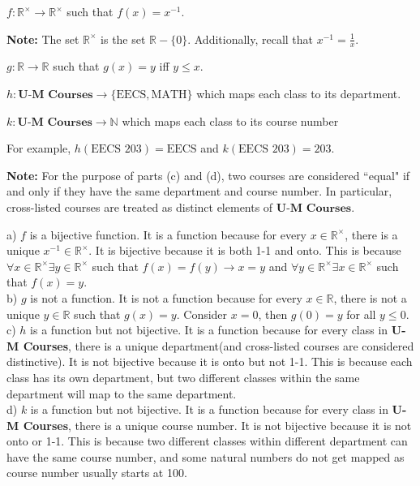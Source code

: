 \documentclass[12pt]{exam}
\begin{document}
\begin{qparts}
	\item $f \colon \mathbb{R}^{\times} \to \mathbb{R}^{\times}$ such that $f(x) = x^{-1}.$

	\textbf{Note:} The set $\mathbb{R}^{\times}$ is the set $\mathbb{R}-\{0\}.$ Additionally, recall that $x^{-1}=\frac 1x.$

	\item $g \colon \mathbb{R} \to \mathbb{R}$ such that $g(x) = y$ iff $y \leq x.$
	\item $h \colon \textbf{U-M Courses} \to \{ \text{EECS}, \text{MATH} \}$ which maps each class to its department.
	\item $k \colon \textbf{U-M Courses} \to \mathbb{N}$ which maps each class to its course number
\end{qparts}
For example, $h(\text{EECS 203}) = \text{EECS}$ and $k(\text{EECS 203}) = 203.$

\textbf{Note:} For the purpose of parts (c) and (d), two courses are considered ``equal" if and only if they have the same department and course number. In particular, cross-listed courses are treated as distinct elements of $\textbf{U-M Courses}.$

\begin{solution}
	a) $f$ is a bijective function. It is a function because for every $x\in\mathbb{R}^{\times}$, there is a unique $x^{-1}\in\mathbb{R}^{\times}$. It is bijective because it is both 1-1 and onto. This is because $\forall x\in\mathbb{R}^{\times}\exists y\in\mathbb{R}^{\times}$ such that $f(x)=f(y)\rightarrow x=y$ and $\forall y\in\mathbb{R}^{\times}\exists x\in\mathbb{R}^{\times}$ such that $f(x)=y$.\\
	b) $g$ is not a function. It is not a function because for every $x\in\mathbb{R}$, there is not a unique $y\in\mathbb{R}$ such that $g(x)=y$. Consider $x=0$, then $g(0)=y$ for all $y\leq 0$.\\
	c) $h$ is a function but not bijective. It is a function because for every class in \textbf{U-M Courses}, there is a unique department(and cross-listed courses are considered distinctive). It is not bijective because it is onto but not 1-1. This is because each class has its own department, but two different classes within the same department will map to the same department.\\
	d) $k$ is a function but not bijective. It is a function because for every class in \textbf{U-M Courses}, there is a unique course number. It is not bijective because it is not onto or 1-1. This is because two different classes within different department can have the same course number, and some natural numbers do not get mapped as course number usually starts at 100.
\end{solution}
\end{document}
